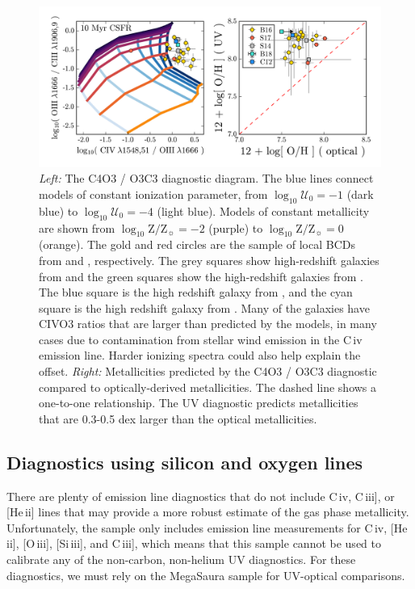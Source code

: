 \documentclass[preprint2]{aastex62}
\newcommand{\oiii}{[O\,{\sc iii}]\xspace}
\newcommand{\heii}{[He\,{\sc ii}]\xspace}
\newcommand{\civ}{C\,{\sc iv}\xspace}
\newcommand{\SiuIII}{[Si\,{\sc iii}]\xspace}
\newcommand{\ciii}{C\,{\sc iii}]\xspace}
\newcommand{\logten}{\ensuremath{\log_{10}}}
\newcommand{\logZeq}[1]{\ensuremath{\logten \mathrm{Z}/\mathrm{Z}_{\sun} = #1}}
\newcommand{\logUeq}[1]{\ensuremath{\logten \mathcal{U}_0 = #1}}
\newcommand{\mage}{{\sc Meg}a{\sc S}a{\sc ura}\xspace}
\begin{document}
\begin{figure}
  \begin{center}
    \includegraphics[width=\linewidth]{figs/af4.png}
    \caption{\emph{Left:} The C4O3 / O3C3 diagnostic diagram. The blue lines connect models of constant ionization parameter, from \logUeq{-1} (dark blue) to \logUeq{-4} (light blue). Models of constant metallicity are shown from \logZeq{-2} (purple) to \logZeq{0} (orange). The gold and red circles are the sample of local BCDs from \citet{Berg+2016} and \citet{Senchyna+2017}, respectively. The grey squares show high-redshift galaxies from \citet{Stark+2014} and the green squares show the high-redshift galaxies from \citet{Rigby+2018b}. The blue square is the high redshift galaxy from \citet{Christensen+2012}, and the cyan square is the high redshift galaxy from \citet{Berg+2018}. Many of the galaxies have CIVO3 ratios that are larger than predicted by the models, in many cases due to contamination from stellar wind emission in the \civ emission line. Harder ionizing spectra could also help explain the offset. \emph{Right:} Metallicities predicted by the C4O3 / O3C3 diagnostic compared to optically-derived metallicities. The dashed line shows a one-to-one relationship. The UV diagnostic predicts metallicities that are 0.3-0.5 dex larger than the optical metallicities.}
    \label{fig:UVCIV}
  \end{center}
\end{figure}

\subsection{Diagnostics using silicon and oxygen lines}\label{sec:UVOpt:SiO}

There are plenty of emission line diagnostics that do not include \civ, \ciii, or \heii lines that may provide a more robust estimate of the gas phase metallicity. Unfortunately, the \citet{Berg+2016} sample only includes emission line measurements for \civ, \heii, \oiii, \SiuIII, and \ciii, which means that this sample cannot be used to calibrate any of the non-carbon, non-helium UV diagnostics. For these diagnostics, we must rely on the \mage sample for UV-optical comparisons. 
\end{document}
